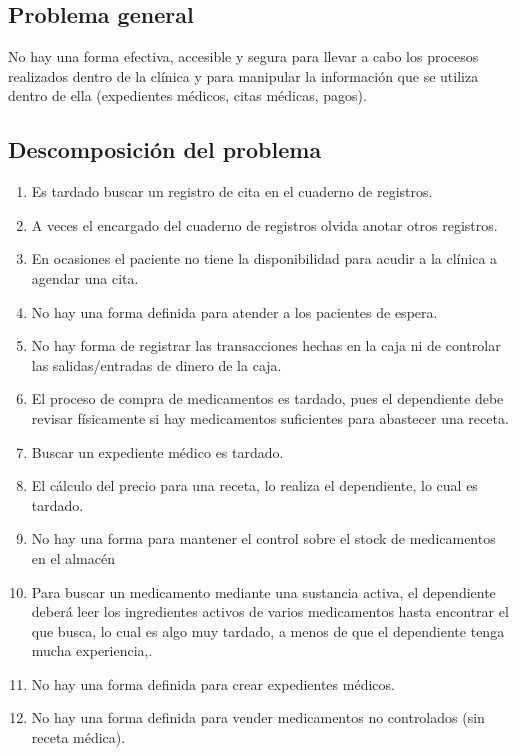 \subsection{Problema general}

No hay una forma efectiva, accesible y segura para llevar a cabo los procesos realizados dentro de la cl\'inica y para manipular la informaci\'on que se utiliza dentro de ella (expedientes m\'edicos, citas m\'edicas, pagos). 

\subsection{Descomposición del problema}

\begin{enumerate}
\item Es tardado buscar un registro de cita en el cuaderno de registros.
\item A veces el encargado del cuaderno de registros olvida anotar otros registros.
\item En ocasiones el paciente no tiene la disponibilidad para acudir a la cl\'inica a agendar una cita.
\item No hay una forma definida para atender a los pacientes de espera.
\item No hay forma de registrar las transacciones hechas en la caja ni de controlar las salidas/entradas de dinero de la caja.
\item El proceso de compra de medicamentos es tardado, pues el dependiente debe revisar f\'isicamente si hay medicamentos suficientes para abastecer una receta.
\item Buscar un expediente m\'edico es tardado.
\item El c\'alculo del precio para una receta, lo realiza el dependiente, lo cual es tardado.
\item No hay una forma para mantener el control sobre el stock de medicamentos en el almac\'en
\item Para buscar un medicamento mediante una sustancia activa, el dependiente deber\'a leer los ingredientes activos de varios medicamentos hasta encontrar el que busca, lo cual es algo muy tardado, a menos de que el dependiente tenga mucha experiencia,.
\item No hay una forma definida para crear expedientes m\'edicos.
\item No hay una forma definida para vender medicamentos no controlados (sin receta m\'edica).

\end{enumerate}
